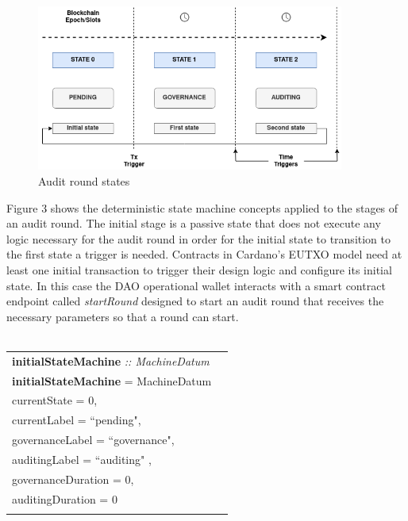 \documentclass[9pt]{article}
\begin{document}
\begin{figure}[ht]
  \centering
  \includegraphics[width=0.9\textwidth]{machine.png}
  \caption{Audit round states}
  \label{fig:Audit round states}
\end{figure}

Figure 3 shows the deterministic state machine concepts applied to the stages of an audit round. The initial stage is a passive state that does not execute any logic necessary for the audit round in order for the initial state to transition to the first state a trigger is needed. Contracts in Cardano's EUTXO model need at least one initial transaction to trigger their design logic and configure its initial state. In this case the DAO operational wallet interacts with a smart contract endpoint called \emph{startRound}  designed to start an audit round that receives the necessary parameters so that a round can start. 
\\
\\
\begin{tabular}{lr}
\textbf{initialStateMachine} \emph{:: MachineDatum}\\
\textbf{initialStateMachine}  = MachineDatum  \textbraceleft{}
\\ \hspace{60mm}currentState = 0, 
\\ \hspace{60mm}currentLabel = ``pending",
\\ \hspace{60mm}governanceLabel = ``governance",
\\ \hspace{60mm}auditingLabel = ``auditing" ,
\\ \hspace{60mm}governanceDuration = 0,
\\ \hspace{60mm}auditingDuration = 0
\\\hspace{60mm}\textbraceright{} 
\end{tabular}
\\
\\
\end{document}
